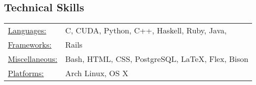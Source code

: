 \documentclass[12pt]{res}
\begin{document}
\begin{resume}
\section{Technical Skills}
\begin{tabular}{l p{4in}}
    \underline{Languages:} & C, CUDA, Python, C++, Haskell, Ruby, Java, \\
    \underline{Frameworks:} & Rails \\
    \underline{Miscellaneous:} & Bash, HTML, CSS, PostgreSQL, \LaTeX, Flex, Bison \\
    \underline{Platforms:} & Arch Linux, OS X
\end{tabular}

\end{resume}
\end{document}
